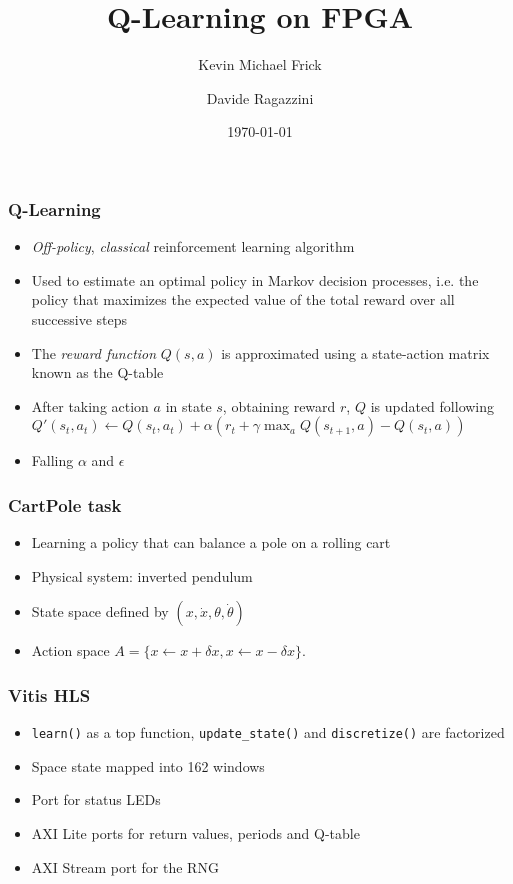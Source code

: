 \documentclass{beamer}
\begin{document}
\title{Q-Learning on FPGA}
\author{Kevin Michael Frick \and Davide Ragazzini}
\date{\today}
\begin{frame}
	\titlepage
\end{frame}

\begin{frame}
	\frametitle{Q-Learning}
	\begin{itemize}
		\item \emph{Off-policy}, \emph{classical} reinforcement learning algorithm
	\item Used to estimate an optimal policy in Markov decision processes, i.e. the policy that maximizes the expected value of the total reward over all successive steps
	\item The \emph{reward function} $Q(s, a)$ is approximated using a state-action matrix known as the Q-table
	\item After taking action $a$ in state $s$, obtaining reward $r$, $Q$ is updated following $Q'(s_t, a_t) \leftarrow Q(s_t, a_t) + \alpha (r_t + \gamma \max_a Q(s_{t+1}, a) - Q(s_t, a))$
	\item Falling $\alpha$ and $\epsilon$
	\end{itemize}
\end{frame}
\begin{frame}
	\frametitle{CartPole task}
	\begin{itemize}
		\item Learning a policy that can balance a pole on a rolling cart
		\item Physical system: inverted pendulum
		\item State space defined by $(x, \dot{x}, \theta, \dot{\theta})$
		\item Action space $A = \{x \leftarrow x + \delta x, x \leftarrow x - \delta x\}$.
	\end{itemize}
\end{frame}
\begin{frame}
	\frametitle{Vitis HLS}
	\begin{itemize}
		\item \texttt{learn()} as a top function, \texttt{update\_state()} and \texttt{discretize()} are factorized
		\item Space state mapped into 162 windows
		\item Port for status LEDs
		\item AXI Lite ports for return values, periods and Q-table
		\item AXI Stream port for the RNG
	\end{itemize}
\end{frame}
\end{document}
